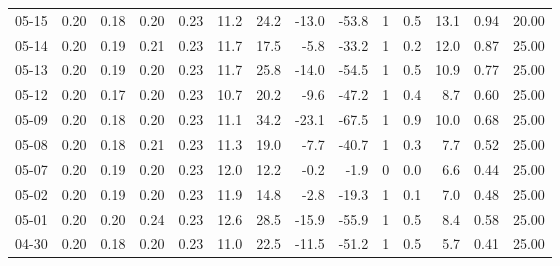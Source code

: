 \begin{threeparttable}
{\begin{tabular}{lrrrrrrrrrrrrr}
  05-15 &          0.20 &          0.18 &          0.20 &        0.23 &                11.2 &                24.2 &      -13.0 &        -53.8 &              1 &                 0.5 &             13.1 &            0.94 &                  20.00 \\
  05-14 &          0.20 &          0.19 &          0.21 &        0.23 &                11.7 &                17.5 &       -5.8 &        -33.2 &              1 &                 0.2 &             12.0 &            0.87 &                  25.00 \\
  05-13 &          0.20 &          0.19 &          0.20 &        0.23 &                11.7 &                25.8 &      -14.0 &        -54.5 &              1 &                 0.5 &             10.9 &            0.77 &                  25.00 \\
  05-12 &          0.20 &          0.17 &          0.20 &        0.23 &                10.7 &                20.2 &       -9.6 &        -47.2 &              1 &                 0.4 &              8.7 &            0.60 &                  25.00 \\
  05-09 &          0.20 &          0.18 &          0.20 &        0.23 &                11.1 &                34.2 &      -23.1 &        -67.5 &              1 &                 0.9 &             10.0 &            0.68 &                  25.00 \\
  05-08 &          0.20 &          0.18 &          0.21 &        0.23 &                11.3 &                19.0 &       -7.7 &        -40.7 &              1 &                 0.3 &              7.7 &            0.52 &                  25.00 \\
  05-07 &          0.20 &          0.19 &          0.20 &        0.23 &                12.0 &                12.2 &       -0.2 &         -1.9 &              0 &                 0.0 &              6.6 &            0.44 &                  25.00 \\
  05-02 &          0.20 &          0.19 &          0.20 &        0.23 &                11.9 &                14.8 &       -2.8 &        -19.3 &              1 &                 0.1 &              7.0 &            0.48 &                  25.00 \\
  05-01 &          0.20 &          0.20 &          0.24 &        0.23 &                12.6 &                28.5 &      -15.9 &        -55.9 &              1 &                 0.5 &              8.4 &            0.58 &                  25.00 \\
  04-30 &          0.20 &          0.18 &          0.20 &        0.23 &                11.0 &                22.5 &      -11.5 &        -51.2 &              1 &                 0.5 &              5.7 &            0.41 &                  25.00 \\

\end{tabular}}
\end{threeparttable}
